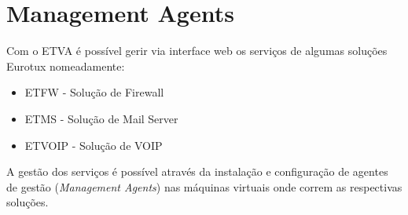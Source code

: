 
\chapter{\textsf{Management Agents}}

Com o ETVA é possível gerir via interface web os serviços de algumas soluções Eurotux nomeadamente:
\begin{itemize}
	\item ETFW - Solução de Firewall
	\item ETMS - Solução de Mail Server
	\item ETVOIP - Solução de VOIP
\end{itemize}
    
    
A gestão dos serviços é possível através da instalação e configuração de agentes de gestão (\emph{Management Agents}) nas máquinas virtuais onde correm as respectivas soluções.



\pagebreak

\pagebreak


